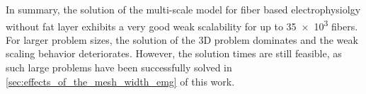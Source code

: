 In summary, the solution of the multi-scale model for fiber based electrophysiolgy without fat layer exhibits a very good weak scalability for up to \num{35e3} fibers. For larger problem sizes, the solution of the 3D problem dominates and the weak scaling behavior deteriorates. However, the solution times are still feasible, as such large problems have been successfully solved in \cref{sec:effects_of_the_mesh_width_emg} of this work.



